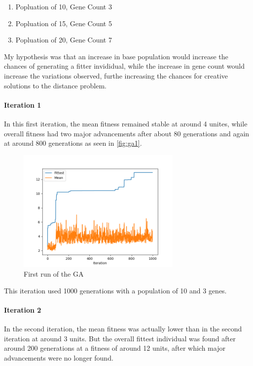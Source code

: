 \begin{enumerate}
    \item Popluation of 10, Gene Count 3
    \item Popluation of 15, Gene Count 5
    \item Popluation of 20, Gene Count 7
\end{enumerate}

My hypothesis was that an increase in base population would increase the chances of generating a fitter invididual, while the increase in gene count would increase the variations observed, furthe increasing the chances for creative solutions to the distance problem.

\paragraph{Iteration 1} In this first iteration, the mean fitness remained stable at around 4 unites, while overall fitness had two major advancements after about 80 generations and again at around 800 generations as seen in \autoref{fig:ga1}.

\begin{figure}[H]
    \centering
    \includegraphics[width=8cm]{test1}
    \caption{First run of the GA}
    \label{fig:ga1}
\end{figure}

This iteration used 1000 generations with a population of 10 and 3 genes.

\paragraph{Iteration 2} In the second iteration, the mean fitness was actually lower than in the second iteration at around 3 units. But the overall fittest individual was found after around 200 generations at a fitness of around 12 units, after which major advancements were no longer found.

